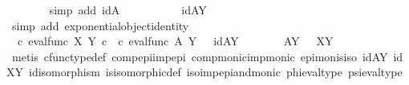 \begin{isabellebody}
\ \ \ \ \ \ \isamarkupfalse%
\ {\isacharparenleft}{\kern0pt}simp\ add{\isacharcolon}{\kern0pt}\ idA{\isacharparenright}{\kern0pt}\isanewline
\ \ \ \ \isamarkupfalse%
\ \isamarkupfalse%
\ {\isachardoublequoteopen}{\isachardot}{\kern0pt}{\isachardot}{\kern0pt}{\isachardot}{\kern0pt}\ \ {\isacharequal}{\kern0pt}\ id{\isacharparenleft}{\kern0pt}A\isactrlbsup Y\isactrlesup {\isacharparenright}{\kern0pt}{\isachardoublequoteclose}\isanewline
\ \ \ \ \ \ \isamarkupfalse%
\ {\isacharparenleft}{\kern0pt}simp\ add{\isacharcolon}{\kern0pt}\ exponential{\isacharunderscore}{\kern0pt}object{\isacharunderscore}{\kern0pt}identity{}{\isacharparenright}{\kern0pt}\isanewline
\ \ \ \ \isamarkupfalse%
\ \isamarkupfalse%
\ {\isachardoublequoteopen}{\isacharparenleft}{\kern0pt}{\isasymphi}\ {\isasymcirc}\isactrlsub c\ eval{\isacharunderscore}{\kern0pt}func\ X\ Y{\isacharparenright}{\kern0pt}\isactrlsup {\isasymsharp}\ {\isasymcirc}\isactrlsub c\ {\isacharparenleft}{\kern0pt}{\isasympsi}\ {\isasymcirc}\isactrlsub c\ eval{\isacharunderscore}{\kern0pt}func\ A\ Y{\isacharparenright}{\kern0pt}\isactrlsup {\isasymsharp}\ \ {\isacharequal}{\kern0pt}\ id{\isacharparenleft}{\kern0pt}A\isactrlbsup Y\isactrlesup {\isacharparenright}{\kern0pt}{\isachardoublequoteclose}\isacommand{{\isachardot}{\kern0pt}}\isamarkupfalse%
\isanewline
\ \ \isamarkupfalse%
\isanewline
\ \ \isamarkupfalse%
\ \ {\isachardoublequoteopen}A\isactrlbsup Y\isactrlesup \ {\isasymcong}\ \ X\isactrlbsup Y\isactrlesup {\isachardoublequoteclose}\isanewline
\ \ \ \ \isamarkupfalse%
\ {\isacharparenleft}{\kern0pt}metis\ cfunc{\isacharunderscore}{\kern0pt}type{\isacharunderscore}{\kern0pt}def\ comp{\isacharunderscore}{\kern0pt}epi{\isacharunderscore}{\kern0pt}imp{\isacharunderscore}{\kern0pt}epi\ comp{\isacharunderscore}{\kern0pt}monic{\isacharunderscore}{\kern0pt}imp{\isacharunderscore}{\kern0pt}monic\ epi{\isacharunderscore}{\kern0pt}mon{\isacharunderscore}{\kern0pt}is{\isacharunderscore}{\kern0pt}iso\ idAY\ idXY\ id{\isacharunderscore}{\kern0pt}isomorphism\ is{\isacharunderscore}{\kern0pt}isomorphic{\isacharunderscore}{\kern0pt}def\ iso{\isacharunderscore}{\kern0pt}imp{\isacharunderscore}{\kern0pt}epi{\isacharunderscore}{\kern0pt}and{\isacharunderscore}{\kern0pt}monic\ phi{\isacharunderscore}{\kern0pt}eval{\isacharunderscore}{\kern0pt}type\ psi{\isacharunderscore}{\kern0pt}eval{\isacharunderscore}{\kern0pt}type{\isacharparenright}{\kern0pt}\isanewline
{}\isamarkupfalse%

\end{isabellebody}
